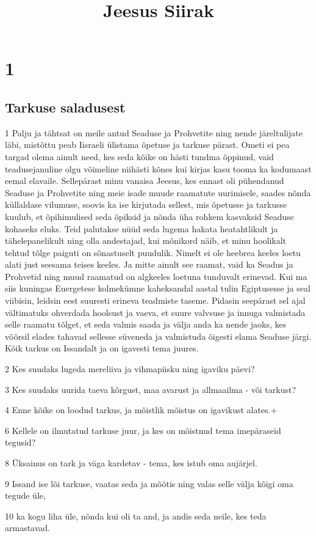 

\title{Jeesus Siirak}

\chapter{1}

\section*{Tarkuse saladusest}

\par 1 Palju ja tähtsat on meile antud Seaduse ja Prohvetite ning nende järeltulijate läbi, mistõttu peab Iisraeli ülistama õpetuse ja tarkuse pärast. Ometi ei pea targad olema ainult need, kes seda kõike on hästi tundma õppinud, vaid teadusejanuline olgu võimeline niihästi kõnes kui kirjas kasu tooma ka kodumaast eemal elavaile. Sellepärast minu vanaisa Jeesus, kes ennast oli pühendanud Seaduse ja Prohvetite ning meie isade muude raamatute uurimisele, saades nõnda küllaldase vilumuse, soovis ka ise kirjutada sellest, mis õpetusse ja tarkusse kuulub, et õpihimulised seda õpiksid ja nõnda üha rohkem kasvaksid Seaduse kohaseks eluks. Teid palutakse nüüd seda lugema hakata heatahtlikult ja tähelepanelikult ning olla andestajad, kui mõnikord näib, et minu hoolikalt tehtud tõlge paiguti on sõnastuselt puudulik. Nimelt ei ole heebrea keeles loetu alati just seesama teises keeles. Ja mitte ainult see raamat, vaid ka Seadus ja Prohvetid ning muud raamatud on algkeeles loetuna tunduvalt erinevad. Kui ma siis kuningas Euergetese kolmekümne kaheksandal aastal tulin Egiptusesse ja seal viibisin, leidsin eest suuresti erineva teadmiste taseme. Pidasin seepärast sel ajal vältimatuks ohverdada hoolsust ja vaeva, et suure valvsuse ja innuga valmistada selle raamatu tõlget, et seda valmis saada ja välja anda ka nende jaoks, kes võõrsil elades tahavad sellesse süveneda ja valmistuda õigesti elama Seaduse järgi. Kõik tarkus on Issandalt ja on igavesti tema juures.
\par 2 Kes suudaks lugeda mereliiva ja vihmapiisku ning igaviku päevi?
\par 3 Kes suudaks uurida taeva kõrgust, maa avarust ja allmaailma - või tarkust?
\par 4 Enne kõike on loodud tarkus, ja mõistlik mõistus on igavikust alates.+
\par 6 Kellele on ilmutatud tarkuse juur, ja kes on mõistnud tema imepäraseid tegusid?
\par 8 Üksainus on tark ja väga kardetav - tema, kes istub oma aujärjel.
\par 9 Issand ise lõi tarkuse, vaatas seda ja mõõtis ning valas selle välja kõigi oma tegude üle,
\par 10 ka kogu liha üle, nõnda kui oli ta and, ja andis seda neile, kes teda armastavad.

